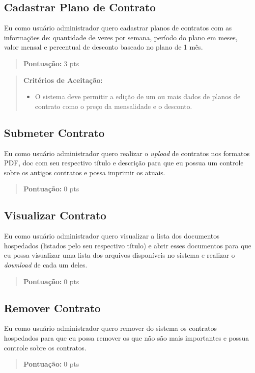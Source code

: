 \subsection[Cadastrar Plano de Contrato]{Cadastrar Plano de Contrato}
Eu como usuário administrador quero cadastrar planos de contratos com as
informações de: quantidade de vezes por semana, período do plano em meses,
valor mensal e percentual de desconto baseado no plano de 1 mês.
\begin{quote}
    \textbf{Pontuação:} 3 pts
\end{quote}
\begin{quote}
\textbf{Critérios de Aceitação:}
    \begin{itemize}
        \item O sistema deve permitir a edição de um ou mais dados de planos de contrato
        como o preço da mensalidade e o desconto.
    \end{itemize}
\end{quote}

\subsection[Submeter Contrato]{Submeter Contrato}
Eu como usuário administrador quero realizar o \textsl{upload} de contratos nos formatos
PDF, doc com seu respectivo título e descrição para que eu possua um controle
sobre os antigos contratos e possa imprimir os atuais.
\begin{quote}
    \textbf{Pontuação:} 0 pts
\end{quote}

\subsection[Visualizar Contrato]{Visualizar Contrato}
Eu como usuário administrador quero visualizar a lista dos documentos hospedados
(listados pelo seu respectivo título) e abrir esses documentos para que eu possa
visualizar uma lista dos arquivos disponíveis no sistema e realizar o \textsl{download}
de cada um deles.
\begin{quote}
    \textbf{Pontuação:} 0 pts
\end{quote}

\subsection[Remover Contrato]{Remover Contrato}
Eu como usuário administrador quero remover do sistema os contratos hospedados
para que eu possa remover os que não são mais importantes e possua controle
sobre os contratos.
\begin{quote}
    \textbf{Pontuação:} 0 pts
\end{quote}

